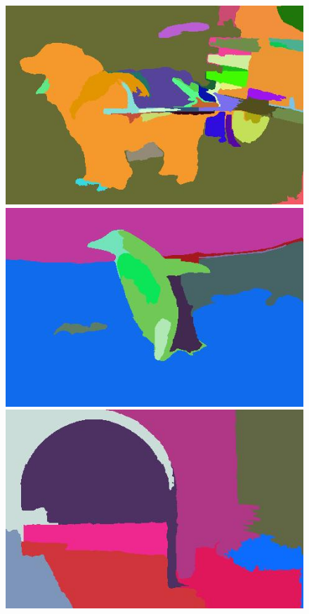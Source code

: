 \begin{figure}[h]
{\begin{minipage}[b]{0.13\linewidth}
\includegraphics[width=1\linewidth]{figures/img/ours_seg/ours_247012.jpg}
\includegraphics[width=1\linewidth]{figures/img/ours_seg/ours_106005.jpg}
\includegraphics[width=1\linewidth]{figures/img/ours_seg/ours_5096.jpg}

\end{minipage}}
\end{figure}

